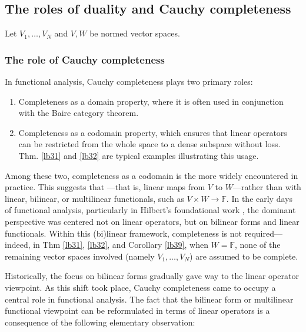 \documentclass[12pt,b5paper,notitlepage]{article}
\theoremstyle{definition}
\theoremstyle{plain}
\newcommand{\Fbb}{\mathbb F}
\numberwithin{equation}{section}
\begin{document}
\subsection{The roles of duality and Cauchy completeness}\label{lb43}

Let $V_1,\dots,V_N$ and $V,W$ be normed vector spaces.


\subsubsection{The role of Cauchy completeness}\label{lb141}



In functional analysis, Cauchy completeness plays two primary roles:
\begin{enumerate}
\item Completeness as a domain property, where it is often used in conjunction with the Baire category theorem.
\item Completeness as a codomain property, which ensures that linear operators can be restricted from the whole space to a dense subspace without loss. Thm. \ref{lb31} and \ref{lb32} are typical examples illustrating this usage.
\end{enumerate}



Among these two, completeness as a codomain is the more widely encountered in practice. This suggests that ---that is, linear maps from $V$ to $W$---rather than with linear, bilinear, or multilinear functionals, such as $V\times W\rightarrow\Fbb$. In the early days of functional analysis, particularly in Hilbert’s foundational work \cite{Hil06}, the dominant perspective was centered not on linear operators, but on bilinear forms and linear functionals. Within this (bi)linear framework, completeness is not required---indeed, in Thm \ref{lb31}, \ref{lb32}, and Corollary \ref{lb39}, when $W=\Fbb$, none of the remaining vector spaces involved (namely $V_1,\dots,V_N$) are assumed to be complete.


Historically, the focus on bilinear forms gradually gave way to the linear operator viewpoint. As this shift took place, Cauchy completeness came to occupy a central role in functional analysis. The fact that the bilinear form or multilinear functional viewpoint can be reformulated in terms of linear operators is a consequence of the following elementary observation:
\end{document}
